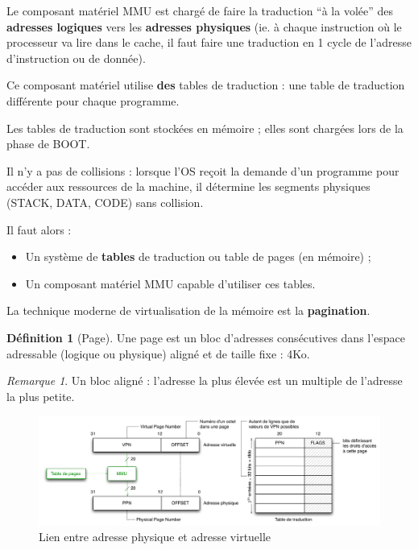 \documentclass[11pt,english,french]{scrreprt}
\theoremstyle{remark}
\newtheorem*{rem*}{Remarque}
\theoremstyle{definition}
\newtheorem*{def*}{Définition}
\begin{document}
Le composant matériel MMU est chargé de faire la traduction ``à la volée'' des \textbf{adresses logiques} vers les \textbf{adresses physiques} (ie. à chaque instruction où le processeur va lire dans le cache, il faut faire une traduction en 1 cycle de l'adresse d'instruction ou de donnée).

Ce composant matériel utilise \textbf{des} tables de traduction : une table de traduction différente pour chaque programme.

Les tables de traduction sont stockées en mémoire ; elles sont chargées lors de la phase de BOOT.

Il n'y a pas de collisions : lorsque l'OS reçoit la demande d'un programme pour accéder aux ressources de la machine, il détermine les segments physiques (STACK, DATA, CODE)  sans collision.

Il faut alors :\begin{itemize}
	\item Un système de \textbf{tables} de traduction ou table de pages (en mémoire) ;
	\item Un composant matériel MMU capable d'utiliser ces tables.
\end{itemize}

La technique moderne de virtualisation de la mémoire est la \textbf{pagination}. 

\begin{def*}[Page]
	Une page est un bloc d'adresses consécutives dans l'espace adressable (logique ou physique) aligné et de taille fixe : 4Ko.
\end{def*}

\begin{rem*}
	Un bloc aligné : l'adresse la plus élevée est un multiple de l'adresse la plus petite.
\end{rem*}

\begin{figure}[!h]
	\center
	\includegraphics[scale=.60]{diagrammes/VPN_PPN}
	\caption{Lien entre adresse physique et adresse virtuelle}
\end{figure}
\end{document}
